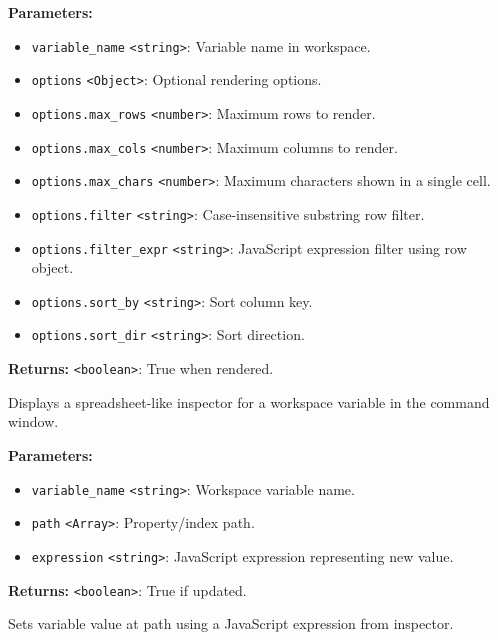 \documentclass[12pt,a4paper]{article}
\begin{document}
\noindent \textbf{Parameters:}
\begin{itemize}
  \item \texttt{variable\_name} \texttt{<string>}: Variable name in workspace.
  \item \texttt{options} \texttt{<Object>}: Optional rendering options.
  \item \texttt{options.max\_rows} \texttt{<number>}: Maximum rows to render.
  \item \texttt{options.max\_cols} \texttt{<number>}: Maximum columns to render.
  \item \texttt{options.max\_chars} \texttt{<number>}: Maximum characters shown in a single cell.
  \item \texttt{options.filter} \texttt{<string>}: Case-insensitive substring row filter.
  \item \texttt{options.filter\_expr} \texttt{<string>}: JavaScript expression filter using row object.
  \item \texttt{options.sort\_by} \texttt{<string>}: Sort column key.
  \item \texttt{options.sort\_dir} \texttt{<string>}: Sort direction.
\end{itemize}

\noindent \textbf{Returns:} \texttt{<boolean>}: True when rendered.

\noindent Displays a spreadsheet-like inspector for a workspace variable in the command window.

\vspace{5mm}
\noindent {}


\noindent \textbf{Parameters:}
\begin{itemize}
  \item \texttt{variable\_name} \texttt{<string>}: Workspace variable name.
  \item \texttt{path} \texttt{<Array>}: Property/index path.
  \item \texttt{expression} \texttt{<string>}: JavaScript expression representing new value.
\end{itemize}

\noindent \textbf{Returns:} \texttt{<boolean>}: True if updated.

\noindent Sets variable value at path using a JavaScript expression from inspector.
\end{document}
